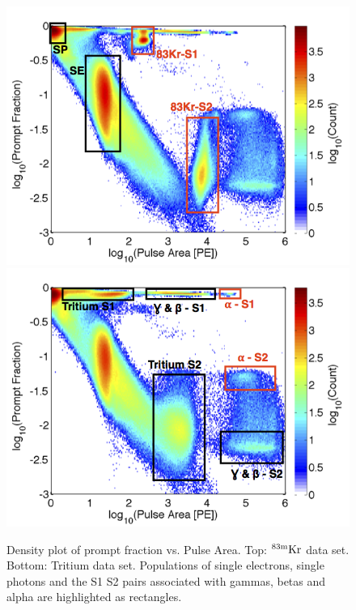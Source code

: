  \begin{figure}[h!]\centering
\includegraphics[width=120mm]{Chapter_LUX_Det/Kr_83_Density_text.png}
\includegraphics[width=120mm]{Chapter_LUX_Det/T_Density_text.png}
\caption{Density plot of prompt fraction vs. Pulse Area. Top: $\rm^{83m}Kr$ data set. Bottom: Tritium data set. Populations of single electrons, single photons and the S1 S2 pairs associated with gammas, betas and alpha are highlighted as rectangles.}
\label{fig:Prompt_Fraction}
\end{figure}


